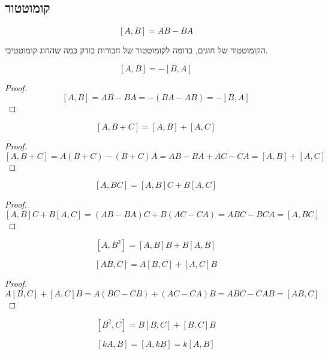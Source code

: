 \documentclass{tstextbook}
\begin{document}
\subsection{קומוטטור}

\begin{definition}
$$[A,B]=AB-BA$$

\end{definition}
\begin{remark}
הקומוטטור של חוגים, בדומה לקומוטטור של חבורות בודק כמה שהחוג קומוטטיבי.

\end{remark}
\begin{proposition}
$$[A,B]=-[B,A]$$

\end{proposition}
\begin{proof}
$$[A,B]=A B-B A=-(B A-A B)=-[B,A]$$

\end{proof}
\begin{proposition}
$$[A,B+C]=[A,B]+[A,C]$$

\end{proposition}
\begin{proof}
$$[A,B+C]=A(B+C)-(B+C)A=A B-B A+A C-C A=[A,B]+[A,C]$$

\end{proof}
\begin{proposition}
$$[A,BC]=[A,B]C+B[A,C]$$

\end{proposition}
\begin{proof}
$$[A,B]C+B[A,C]=(A B-B A)C+B(A C-C A)=A B C-B C A=[A,B C]$$

\end{proof}
\begin{corollary}
$$[A,B^{2}]=[A,B]B+B[A,B]$$

\end{corollary}
\begin{proposition}
$$[A B,C]=A[B,C]+[A,C]B$$

\end{proposition}
\begin{proof}
$$A[B,C]+[A,C]B=A(B C-C B)+(A C-C A)B=A B C-C A B=[A B,C]$$

\end{proof}
\begin{corollary}
$$[B^{2},C]=B[B,C]+[B,C]B$$

\end{corollary}
\begin{proposition}
$$[k A,B]=[A,k B]=k[A,B]$$

\end{proposition}
\end{document}

